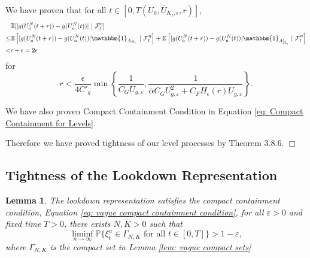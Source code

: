 \documentclass[12pt]{article}
\newenvironment {proof}{{\noindent\bf Proof }}{\hfill $\Box$ \medskip}
\newtheorem{lemma}[theorem]{Lemma}
\def \bar{\overline}
\begin{document}
\begin{proof}
We have proven that for all $t \in [0, T(U_0,\overline{U}_{K_{\epsilon},\epsilon},r)]$,
\begin{equation}
\begin{aligned}
& \mathbb{E}[|g(U^{N}_{a}(t+r ))-g(U^{N}_{a}(t))|~|~{\cal F}_t^{
\eta}]\\
\leq & \mathbb{E}\left[|g(U^{N}_{a}(t+r ))-g(U^{N}_{a}(t))| \mathbbm{1}_{A_{H_{\epsilon}}} ~|~{\cal F}_t^{
\eta}\right]+ \mathbb{E}\left[|g(U^{N}_{a}(t+r ))-g(U^{N}_{a}(t))| \mathbbm{1}_{A_{H_{\epsilon}}^c} ~|~{\cal F}_t^{
\eta}\right] \\
< & \epsilon + \epsilon = 2\epsilon
\end{aligned}    
\end{equation}
for  
\begin{equation*}
r < \frac{\epsilon  }{4C'_g}\min\left\{\frac{1}{C_G U_{g,\varepsilon}}, \frac{1}{\bar{\alpha} C_G U_{g,\varepsilon}^2
        +
        C_F H_{\epsilon}(r) U_{g,\varepsilon}}\right\}.    
\end{equation*}

We have also proven Compact Containment Condition in Equation \eqref{eq: Compact Containment for Levels}.

Therefore we have proved tightness of our level processes by \cite{EK} Theorem 3.8.6.
\end{proof}

\subsection{Tightness of the Lookdown Representation}
\begin{lemma}
The lookdown representation satisfies the compact containment condition, 
Equation \eqref{eq: vague compact containment condition}, 
for all $\varepsilon > 0$ and fixed time $T > 0$, there exists $N,K> 0$ such that 
\begin{equation}
\liminf_{n \to \infty}\mathbb{P}\{ \xi^n_t \in \Gamma_{N,K} \text{ for all } t\in [0,T]\} > 1-\varepsilon,
\end{equation}
where $\Gamma_{N,K}$ is the compact set in Lemma \ref{lem: vague compact sets}
\end{lemma}
\end{document}
